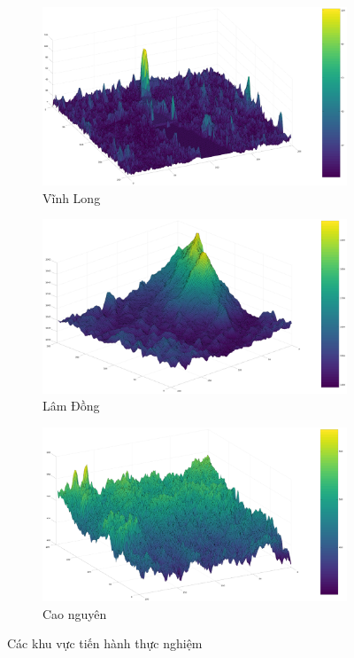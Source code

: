 \begin{figure}[H]  
    \ContinuedFloat
    \begin{subfigure}[b]{\linewidth}
        \includegraphics[width=0.9\linewidth]{picture/Selection_037.png}
        \caption{Vĩnh Long}
    \end{subfigure}
    \begin{subfigure}[b]{\linewidth}
        \includegraphics[width=0.9\linewidth]{picture/Selection_038.png}
        \caption{Lâm Đồng}
    \end{subfigure}
    \begin{subfigure}[b]{\linewidth}
        \includegraphics[width=0.9\linewidth]{picture/Selection_039.png}
        \caption{Cao nguyên}
    \end{subfigure}

    \caption{Các khu vực tiến hành thực nghiệm}
    \label{areadescription}
\end{figure}